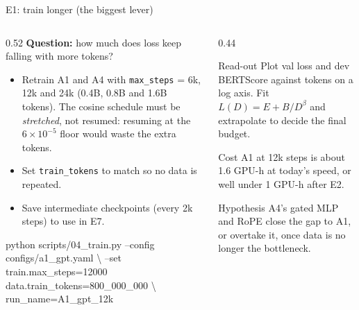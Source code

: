 \documentclass[aspectratio=169,11pt]{beamer}
\newcommand{\code}[1]{\texttt{\small #1}}
\begin{document}
\begin{frame}{E1: train longer (the biggest lever)}
  \begin{columns}[T]
    \begin{column}{0.52\textwidth}
      \small
      \textbf{Question:} how much does loss keep falling with more tokens?
      \begin{itemize}
        \item Retrain A1 and A4 with \code{max\_steps} = 6k, 12k and 24k (0.4B, 0.8B and 1.6B tokens).
              The cosine schedule must be \emph{stretched}, not resumed: resuming at the $6\!\times\!10^{-5}$ floor would waste the extra tokens.
        \item Set \code{train\_tokens} to match so no data is repeated.
        \item Save intermediate checkpoints (every 2k steps) to use in E7.
      \end{itemize}
      \vspace{1mm}
\begin{semiverbatim}\scriptsize
python scripts/04\_train.py --config configs/a1\_gpt.yaml \textbackslash
  --set train.max\_steps=12000 data.train\_tokens=800\_000\_000 \textbackslash
        run\_name=A1\_gpt\_12k
\end{semiverbatim}
    \end{column}
    \begin{column}{0.44\textwidth}
      \begin{block}{Read-out}
        \small Plot val loss and dev BERTScore against tokens on a log axis. Fit $L(D)=E+B/D^{\beta}$ and extrapolate to decide the final budget.
      \end{block}
      \begin{exampleblock}{Cost}
        \small A1 at 12k steps is about 1.6 GPU-h at today's speed, or well under 1 GPU-h after E2.
      \end{exampleblock}
      \begin{alertblock}{Hypothesis}
        \small A4's gated MLP and RoPE close the gap to A1, or overtake it, once data is no longer the bottleneck.
      \end{alertblock}
    \end{column}
  \end{columns}
\end{frame}
\end{document}
